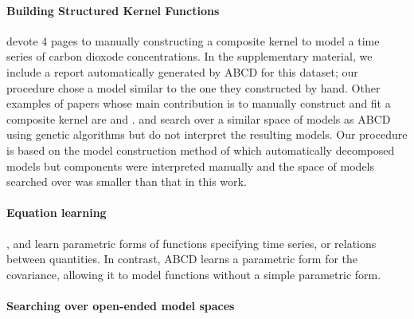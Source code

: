 \documentclass[letterpaper]{article}
\newcommand{\procedurename}{ABCD}
\renewcommand{\fTBD}[1]{}
\begin{document}
\paragraph{Building Structured Kernel Functions}
\cite{rasmussen38gaussian} devote 4 pages to manually constructing a composite kernel to model a time series of carbon dioxode concentrations.
In the supplementary material, we include a report automatically generated by \procedurename{} for this dataset; our procedure chose a model similar to the one they constructed by hand.
Other examples of papers whose main contribution is to manually construct and fit a composite \gp{} kernel are \cite{klenske2012nonparametric} and \cite{lloydgefcom2012}.
\citet{diosan2007evolving, bing2010gp} and \citet{kronberger2013evolution} search over a similar space of models as \procedurename{} using genetic algorithms but do not interpret the resulting models.
Our procedure is based on the model construction method of \citet{DuvLloGroetal13} which automatically decomposed models but components were interpreted manually and the space of models searched over was smaller than that in this work. 

\paragraph{Equation learning}
\cite{todorovski1997declarative}, \cite{washio1999discovering} and \cite{schmidt2009distilling} learn parametric forms of functions specifying time series, or relations between quantities.
In contrast, \procedurename{} learns a parametric form for the covariance, allowing it to model functions without a simple parametric form.

\paragraph{Searching over open-ended model spaces}
\end{document}
